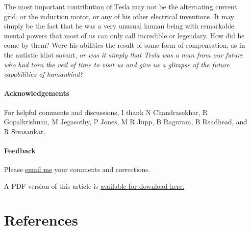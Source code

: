 \documentclass[
  11pt,
  a4paper,
]{article}
\begin{document}
The most important contribution of Tesla may not be the alternating
current grid, or the induction motor, or any of his other electrical
inventions. It may simply be the fact that he was a very unusual human
being with remarkable mental powers that most of us can only call
incredible or legendary. How did he come by them? Were his abilities the
result of some form of compensation, as in the autistic idiot savant,
\emph{or was it simply that Tesla was a man from our future who had torn
the veil of time to visit us and give us a glimpse of the future
capabilities of humankind?}

\hypertarget{acknowledgements}{%
\paragraph{Acknowledgements}\label{acknowledgements}}

For helpful comments and discussions, I thank N Chandrasekhar, R
Gopalkrishnan, M Jegasothy, P Jones, M R Jupp, B Raguram, B Readhead,
and R Sivasankar.

\hypertarget{feedback}{%
\paragraph{Feedback}\label{feedback}}

Please \href{mailto:feedback.swanlotus@gmail.com}{email me} your
comments and corrections.

\noindent A PDF version of this article is
\href{./mind-of-tesla.pdf}{available for download here.}


\hypertarget{bibliography}{%
\section*{References}\label{bibliography}}
\end{document}
